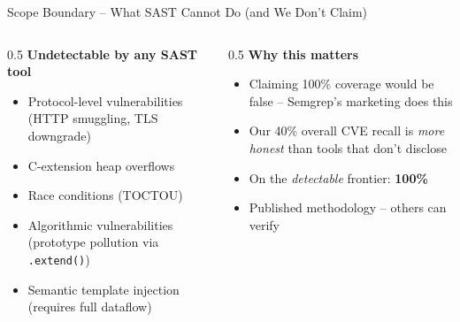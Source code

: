 \documentclass[aspectratio=169,12pt]{beamer}
\newcommand{\good}[1]{\textbf{\color{acrGreen}#1}}
\begin{document}
\begin{frame}{Scope Boundary -- What SAST Cannot Do (and We Don't Claim)}
  \begin{columns}[T]
    \begin{column}{0.5\textwidth}
      \textbf{Undetectable by any SAST tool}
      \begin{itemize}\small
        \item Protocol-level vulnerabilities (HTTP smuggling, TLS downgrade)
        \item C-extension heap overflows
        \item Race conditions (TOCTOU)
        \item Algorithmic vulnerabilities (prototype pollution via \texttt{.extend()})
        \item Semantic template injection (requires full dataflow)
      \end{itemize}
    \end{column}
    \begin{column}{0.5\textwidth}
      \textbf{Why this matters}
      \begin{itemize}\small
        \item Claiming 100\% coverage would be false -- Semgrep's marketing does this
        \item Our 40\% overall CVE recall is \emph{more honest} than tools that don't disclose
        \item On the \emph{detectable} frontier: \good{100\%}
        \item Published methodology -- others can verify
      \end{itemize}
    \end{column}
  \end{columns}
\end{frame}
\end{document}
